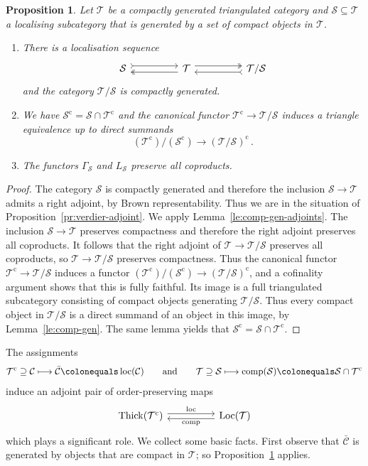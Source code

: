 \documentclass{amsart}[a4]
\newtheorem{proposition}[theorem]{Proposition}
\theoremstyle{definition}
\theoremstyle{remark}
\numberwithin{equation}{section}
\newcommand{\comp}{\operatorname{comp}}
\newcommand{\loc}{\operatorname{loc}}
\newcommand{\Loc}{\operatorname{Loc}}
\newcommand{\Thick}{\operatorname{Thick}}
\newcommand{\lto}{\longrightarrow}
\newcommand{\cat}{\mathcal}
\let\Gamma\varGamma
\begin{document}
\begin{proposition}\label{pr:bousfield-comp-gen}
  Let $\cat T$ be a compactly generated triangulated category and 
  $\cat S\subseteq \cat T$ a localising subcategory that is generated by a set
  of compact objects in $\cat T$.
\begin{enumerate}
\item
  There is a localisation sequence
\[\begin{tikzcd}
\cat S \arrow[tail,yshift=0.75ex]{rr} &&\cat T  \arrow[twoheadrightarrow,yshift=-0.75ex]{ll}
\arrow[twoheadrightarrow,yshift=0.75ex]{rr} &&\cat T/\cat S \arrow[tail,yshift=-0.75ex]{ll}
\end{tikzcd}\]
and the category $\cat T/\cat S$ is compactly generated.
\item  We have $\cat S^{\mathrm c}=\cat S\cap\cat T^{\mathrm c}$ and the canonical functor
$\cat T^{\mathrm c}\to\cat T/\cat S$ induces a triangle equivalence up to direct
summands
\[(\cat T^{\mathrm c})/(\cat S^{\mathrm c})\lto (\cat T/\cat S)^{\mathrm c}\,.\]
\item The functors $\Gamma_{\cat S}$ and $L_{\cat S}$ preserve all
  coproducts.
  \end{enumerate}
\end{proposition}
\begin{proof}
  The category $\cat S$ is compactly generated and therefore the
  inclusion $\cat S\to\cat T$ admits a right adjoint, by Brown
  representability. Thus we are in the situation of
  Proposition~\ref{pr:verdier-adjoint}. We apply
  Lemma~\ref{le:comp-gen-adjoints}. The inclusion $\cat S\to\cat T$
  preserves compactness and therefore the right adjoint preserves all
  coproducts. It follows that the right adjoint of
  $\cat T\to\cat T/\cat S$ preserves all coproducts, so
  $\cat T\to\cat T/\cat S$ preserves compactness.  Thus the canonical
  functor $\cat T^{\mathrm c}\to\cat T/\cat S$ induces a functor
  $(\cat T^{\mathrm c})/(\cat S^{\mathrm c})\to (\cat T/\cat S)^{\mathrm c}$, and a cofinality
  argument shows that this is fully faithful. Its image is a full
  triangulated subcategory consisting of compact objects generating
  $\cat T/\cat S$. Thus every compact object in $\cat T/\cat S$ is a
  direct summand of an object in this image, by
  Lemma~\ref{le:comp-gen}. The same lemma yields that
  $\cat S^{\mathrm c}=\cat S\cap\cat T^{\mathrm c}$.
\end{proof}


The assignments
\[\cat T^{\mathrm c}\supseteq\cat C\longmapsto\bar{\cat C}\colonequals\loc(\cat
  C)\qquad\text{and}\qquad\cat T\supseteq\cat S\longmapsto \comp(\cat S)\colonequals\cat S\cap\cat
  T^{\mathrm c}\] induce an adjoint pair of order-preserving maps
\[
  \begin{tikzcd}
\Thick(\cat T^{\mathrm c}) \ar[rr,yshift=2.5,"\loc"] &&  \ar[ll,yshift=-2.5,"\comp"]
\Loc(\cat T)
\end{tikzcd}
\]
which plays a significant role. We collect some basic facts. First
observe that $\bar{\cat C}$ is generated by objects that are compact
in $\cat T$; so Proposition~\ref{pr:bousfield-comp-gen} applies.
\end{document}
